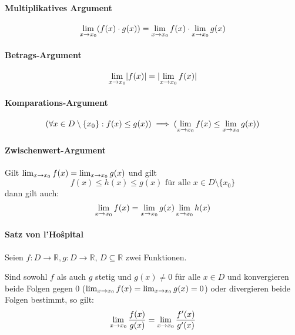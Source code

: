         \paragraph{Multiplikatives Argument}
            \[ \lim_{x \to x_0 } (f(x) \cdot g(x)) = \lim_{x \to x_0 } f(x) \cdot \lim_{x \to x_0 } g(x) \]

        \paragraph{Betrags-Argument}
            \[ \lim_{x \to x_0 } \lvert f(x) \rvert = \lvert \lim_{x \to x_0 } f(x) \rvert \]

        \paragraph{Komparations-Argument}
            \[ (\forall x \in D \setminus \{ x _ 0 \} : f(x) \leq g(x)) \implies (\lim_{x \to x_0 } f(x) \leq \lim_{x \to x_0 } g(x)) \]

        \paragraph{Zwischenwert-Argument}
            Gilt $ \lim_{x \to x_0 } f(x) = \lim_{x \to x_0 } g(x) $ und gilt
            \begin{equation*}
                f(x) \leq h(x) \leq g(x) \text{ für alle } x \in D \setminus \{ x _ 0 \}
            \end{equation*}
            \indent dann gilt auch:
            \begin{equation*}
                \lim_{x \to x_0 } f(x) = \lim_{x \to x_0 } g(x) \lim_{x \to x_0 } h(x)
            \end{equation*}

        \paragraph{Satz von l'Ho{\^s}pital}
            Seien $ f : D \rightarrow \mathbb{R}, g : D \rightarrow \mathbb{R} $, $ D \subseteq \mathbb{R} $ zwei Funktionen.

            Sind sowohl $ f $ als auch $ g $ stetig und $ g(x) \neq 0 $ für alle $ x \in D $ und konvergieren beide Folgen gegen $ 0 $ ($ \lim_{x \to x_0 } f(x) = \lim_{x \to x_0 } g(x) = 0 $) oder divergieren beide Folgen bestimmt, so gilt:
            \begin{equation*}
                \lim_{x \to x_0 } \frac{f(x)}{g(x)} = \lim_{x \to x_0 } \frac{f'(x)}{g'(x)}
            \end{equation*}


